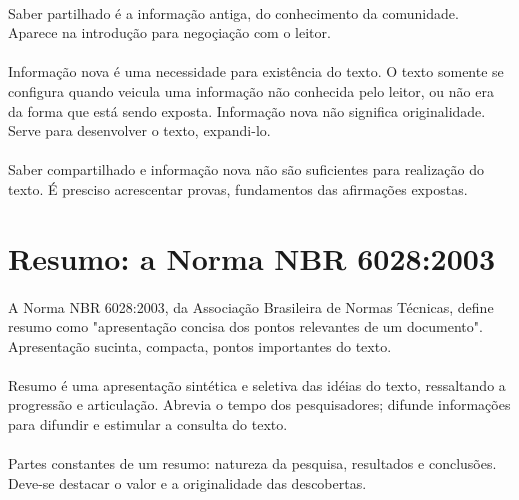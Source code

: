 \paragraph{}
Saber partilhado é a informação antiga, do conhecimento da comunidade. Aparece na introdução para negoçiação com o leitor.

\paragraph{}
Informação nova é uma necessidade para existência do texto. O texto somente se configura quando veicula uma informação não conhecida pelo leitor, ou não era da forma que está sendo exposta. Informação nova não significa originalidade. Serve para desenvolver o texto, expandi-lo.

\paragraph{}
Saber compartilhado e informação nova não são suficientes para realização do texto. É presciso acrescentar provas, fundamentos das afirmações expostas.

\section{Resumo: a Norma NBR 6028:2003}

\paragraph{}
A Norma NBR 6028:2003, da Associação Brasileira de Normas Técnicas, define resumo como "apresentação concisa dos pontos relevantes de um documento". Apresentação sucinta, compacta, pontos importantes do texto.

\paragraph{}
Resumo é uma apresentação sintética e seletiva das idéias do texto, ressaltando a progressão e articulação. Abrevia o tempo dos pesquisadores; difunde informações para difundir e estimular a consulta do texto.

\paragraph{}
Partes constantes de um resumo: natureza da pesquisa, resultados e conclusões. Deve-se destacar o valor e a originalidade das descobertas.

